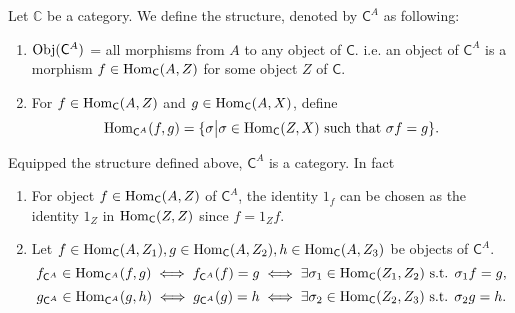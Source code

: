 \begin{solution}
Let $\mathbb{C}$ be a category. We define the structure, denoted by $\mathsf{C}^{A}$ as following:
\begin{enumerate}
\item $\mathrm{Obj}(\mathsf{C}^{A})$ = all morphisms from $A$ to any object of $\mathsf{C}$. i.e. an object
of $\mathsf{C}^{A}$ is a morphism $f\in \mathrm{Hom}_{\mathsf{C}}(A, Z)$ for some object $Z$ of $\mathsf{C}$.
\item For $f\in \mathrm{Hom}_{\mathsf{C}}(A, Z)$ and $g\in \mathrm{Hom}_{\mathsf{C}}(A, X)$, 
define $$\mathrm{Hom}_{\mathsf{C}^{A}}(f,g) = \{\sigma\big{|}\sigma\in \mathrm{Hom}_{\mathsf{C}}(Z, X)\text{ such that } \sigma f = g\}.$$
\end{enumerate}
Equipped the structure defined above, $\mathsf{C}^{A}$ is a category. In fact
\begin{enumerate}
\item For object $f\in \mathrm{Hom}_{\mathsf{C}}(A, Z)$ of $\mathsf{C}^{A}$, the identity $1_{f}$ can be chosen as the 
identity $1_{Z}$ in $\mathrm{Hom}_{\mathsf{C}}(Z, Z)$ since $f = 1_Zf$.
\item Let $f\in \mathrm{Hom}_{\mathsf{C}}(A, Z_1),g\in \mathrm{Hom}_{\mathsf{C}}(A, Z_2),h\in \mathrm{Hom}_{\mathsf{C}}(A, Z_3)$ be objects 
of $\mathsf{C}^{A}$.
$$f_{\mathsf{C}^{A}}\in \mathrm{Hom}_{\mathsf{C}^{A}}(f, g)\iff f_{\mathsf{C}^{A}}(f) = g 
\iff \exists \sigma_1\in \mathrm{Hom}_{\mathsf{C}}(Z_1, Z_2) \text{ s.t. } \sigma_1 f = g,$$ 
$$g_{\mathsf{C}^{A}}\in \mathrm{Hom}_{\mathsf{C}^{A}}(g, h) \iff g_{\mathsf{C}^{A}}(g) = h 
\iff \exists \sigma_2\in \mathrm{Hom}_{\mathsf{C}}(Z_2, Z_3) \text{ s.t. } \sigma_2 g = h.$$


\end{enumerate}
\end{solution}
